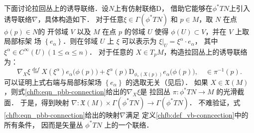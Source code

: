 下面讨论{\kaishu 拉回丛上的诱导联络}．设$N$上有仿射联络$\mathrm{D}$， 
借助它能够在$\phi^* T N$上引入诱导联络$\nabla$，具体构造如下．
对于任意$\xi \in \Gamma(\phi^* T N)$ 和 $p \in M$，取 $N$ 在点 $\phi(p) \in N$的
开邻域 $V$ 以及 $M$ 在点 $p$ 的邻域 $U$ 使得 $\phi(U) \subset V$，并在 $V$ 上取局部标架
场 $\left\{e_\alpha\right\}$．则在邻域 $U$ 上 $\xi$ 可以表示为
$\xi |_U=\xi^\alpha \cdot e_\alpha$，
其中$\xi^\alpha \in C^{\infty}(U)(1 \leqslant \alpha \leqslant n)$．
对于任意的 $X \in T_p M$，构造{\heiti 拉回丛上的诱导联络}为：
\begin{equation}\label{chfb:eqn_pbb-connection}
    \nabla_X \xi \overset{def}{=} X(\xi^\alpha ) e_\alpha\bigl(\phi(p)\bigr)+\xi^\alpha(p) 
    \mathrm{D}_{\phi_*(X(p))} e_\alpha\bigl(\phi(p)\bigr), \quad \in \pi^{-1}(p) .
\end{equation}
可以证明上式右端与局部标架场 $\left\{e_\alpha\right\}$ 的选取无关（见后）．
如果 $X \in \mathfrak{X}(M)$，则式\eqref{chfb:eqn_pbb-connection}给出的$\nabla_X \xi$是
拉回丛 $\pi: \phi^* T N \rightarrow M$ 的光滑截面．
于是，得到映射 $\nabla: \mathfrak{X}(M) \times \Gamma\left(\phi^* T N\right) 
\rightarrow \Gamma\left(\phi^* T N\right)$．
不难验证，式\eqref{chfb:eqn_pbb-connection}给出的映射$\nabla$满足
定义\ref{chfb:def_vb-conncection}中的所有条件，
因而是矢量丛 $\phi^* T N$ 上的一个联络．


